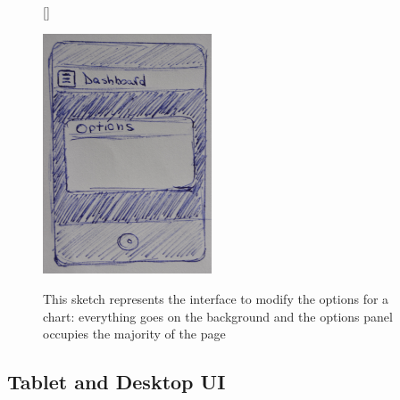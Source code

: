 \documentclass[a4paper,13pt]{report}
\begin{document}
\begin{figure}[H]
[\FBwidth]
{\caption{This sketch represents the interface to modify the options for a chart: everything goes on the background and the options panel occupies the majority of the page}\label{fig:test}}
{\includegraphics[width=5cm]{pics/UISketches/mobileSK3}}
\end{figure}




\subsection{ Tablet and Desktop UI  }
\end{document}
